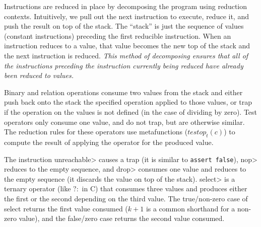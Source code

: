 \begin{mathpar}
\end{mathpar}

Instructions are reduced in place by decomposing the program using reduction contexts.
Intuitively, we pull out the next instruction to execute, reduce it, and push the result on top of the stack.
The ``stack'' is just the sequence of values (\ie constant instructions) preceding the first reducible instruction.
When an instruction reduces to a value, that value becomes the new top of the stack and the next instruction is reduced.
\emph{This method of decomposing ensures that all of the instructions preceding the instruction currently being reduced have already been reduced to values.}

Binary and relation operations consume two values from the stack and either push back onto the stack the specified operation applied to those values, or trap if the operation on the values is not defined (in the case of dividing by zero).
Test operators only consume one value, and do not trap, but are otherwise similar.
The reduction rules for these operators use metafunctions (\eg $testop_t(c)$) to compute the result of applying the operator for the produced value.

The instruction \<unreachable> causes a trap (it is similar to \eg \texttt{assert false}), \<nop> reduces to the empty sequence, and \<drop> consumes one value and reduces to the empty sequence (\ie it discards the value on top of the stack).
\<select> is a ternary operator (like $?:$ in C) that consumes three values and produces either the first or the second depending on the third value.
The true/non-zero case of select returns the first value consumed ($k+1$ is a common shorthand for a non-zero value), and the false/zero case returns the second value consumed.


